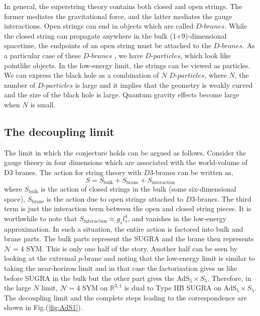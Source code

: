 In general, the superstring theory contains both closed and open strings. 
The former mediates the gravitational force, and the latter mediates the gauge interactions. 
Open strings can end in objects which are called $\textit{D-branes}$. 
While the closed string can propagate anywhere in the bulk (1+9)-dimensional spacetime, 
the endpoints of an open string must be attached to the $\textit{D-branes}$.  
As a particular case of these $\textit{D-branes }$, we have $\textit{D-particles}$, 
which look like pointlike objects. In the low-energy limit, the strings can be
 viewed as particles. We can express the black hole as a combination of 
 $N$ $\textit{D-particles}$, 
where $N$, the number of $\textit{D-particles}$ is large and it implies that 
the geometry is weakly curved and the size of the black hole is large. Quantum gravity effects become
large when $N$ is small. 

\subsection{The decoupling limit} 

The limit in which the conjecture holds can be argued as follows. 
Consider the gauge theory in four dimensions which are associated 
with the world-volume of D3 branes. 
The action for string theory with $D3$-branes 
can be written as, 
\begin{equation}
S = S_{\text{bulk}} + S_{\text{brane}}  + S_{\text{interaction}} 
\end{equation}
where $ S_{\text{bulk}}$ is the action of closed strings in the bulk (some six-dimensional space), 
$S_{\text{brane}}$ is the action due to open strings attached to 
$D3$-branes. The third term is just the interaction term between
the open and closed string pieces. It is worthwhile to note that 
$S_{\text{interaction}} \approx g_{s} l_{s}^4$, and vanishes
in the low-energy approximation. In such a situation, the entire 
action is factored into bulk and brane parts. 
The bulk parts represent the SUGRA and the brane then represents 
$\mathcal{N}=4$ SYM. 
This is only one half of the story. Another half can be seen by 
looking at the extremal $p$-brane 
and noting that the low-energy limit is similar to taking the 
near-horizon limit and in that case the 
factorization gives us like before SUGRA in the bulk
but the other part gives the AdS$_5 \times S_5$.
Therefore, in the large $N$ limit, $\mathcal{N}=4$ SYM on $\mathbb{R}^{3,1}$ is dual to 
Type IIB SUGRA on AdS$_5 \times S_5$.
The decoupling limit and the complete steps leading to the 
correspondence are shown in Fig.(\ref{fig:AdS1}). 

